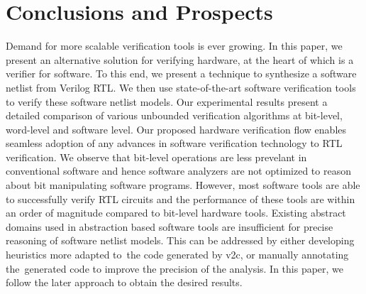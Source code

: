 \section{Conclusions and Prospects}\label{sec:concl}
%
Demand for more scalable verification tools is ever growing.  In this paper,
we present an alternative solution for verifying hardware, at the heart of
which is a verifier for software.  To this end, we present a technique to 
synthesize a software netlist from Verilog RTL.  We then use state-of-the-art
software verification tools to verify these software netlist models.  Our 
experimental results present a detailed comparison of various unbounded 
verification algorithms at bit-level, word-level and software level.  Our proposed 
hardware verification flow enables seamless adoption of any advances in software 
verification technology to RTL verification.  We observe that bit-level operations 
are less prevelant in conventional software and hence software analyzers are not 
optimized to reason about bit manipulating software programs.  However, most software 
tools are able to successfully verify RTL circuits and the performance of these tools 
are within an order of magnitude compared to bit-level hardware tools.  Existing abstract 
domains used in abstraction based software tools are insufficient for precise reasoning 
of software netlist models.  This can be addressed by either developing heuristics 
more adapted to the code generated by v2c, or manually annotating the generated code 
to improve the precision of the analysis. In this paper, we follow the later approach 
to obtain the desired results. 
